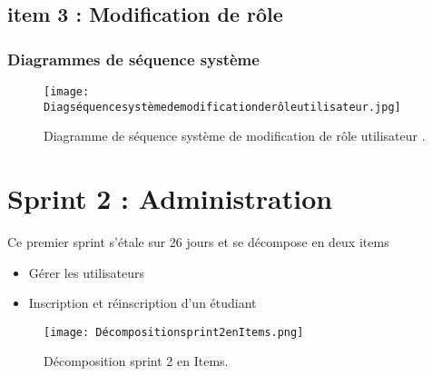 \clearpage
\subsection{item 3 : Modification de rôle}
\subsubsection{Diagrammes de séquence système }


\begin{figure}[ht]
	\centering
	\texttt{[image: Diagséquencesystèmedemodificationderôleutilisateur.jpg]}
	\caption{Diagramme de séquence système de modification de rôle utilisateur .}
	\label{fig:Diagramme de séquence système de modification de rôle utilisateur }
\end{figure}
\FloatBarrier
\clearpage
\clearpage



\section{Sprint 2 : Administration }



\begin{fquote}
Ce premier sprint s’étale sur 26 jours et se décompose en deux items \end{fquote}
\smallskip
\begin{itemize}[label=$\diamond$]
	\item Gérer les utilisateurs
    \item  Inscription et réinscription d'un étudiant
	
\end{itemize}
\medskip
\medskip
\medskip
\medskip
\medskip
\medskip
\medskip
\medskip
\medskip
\medskip
\medskip
\begin{figure}[ht]
	\centering
	\texttt{[image: Décompositionsprint2enItems.png]}
	\caption{Décomposition sprint 2 en Items.}
	\label{fig:Décomposition sprint 2 en Items}
\end{figure}
\FloatBarrier
\clearpage




